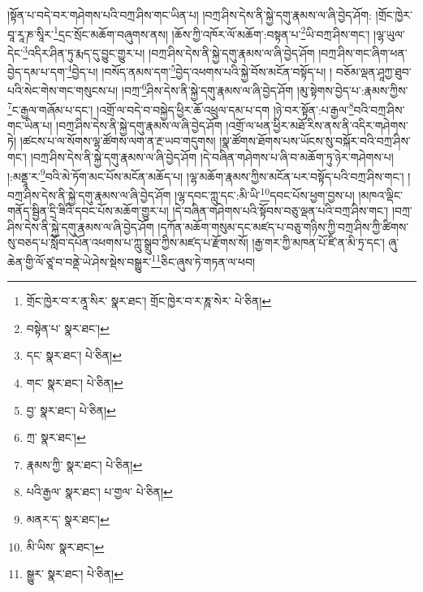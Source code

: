 །སྟོན་པ་བདེ་བར་གཤེགས་པའི་བཀྲ་ཤིས་གང་ཡིན་པ། །བཀྲ་ཤིས་དེས་ནི་སྐྱེ་དགུ་རྣམས་ལ་ཞི་བྱེད་ཤོག: །གྲོང་ཁྱེར་བཱ་རཱ་ཎ་སཱིར་\footnote{གྲོང་ཁྱེར་བ་ར་ནཱ་སིར་  སྣར་ཐང་། གྲོང་ཁྱེར་བ་ར་ཎཱ་སེར་  པེ་ཅིན། }དྲང་སྲོང་མཆོག་བཞུགས་ནས། །ཆོས་ཀྱི་འཁོར་ལོ་མཆོག་:བསྟན་པ་\footnote{བསྟེན་པ་  སྣར་ཐང་། }ཡི་བཀྲ་ཤིས་གང་། །ལྷ་ཡུལ་དེང་\footnote{དང་  སྣར་ཐང་།  པེ་ཅིན། }འདིར་ཤིན་ཏུ་རྨད་དུ་བྱུང་གྱུར་པ། །བཀྲ་ཤིས་དེས་ནི་སྐྱེ་དགུ་རྣམས་ལ་ཞི་བྱེད་ཤོག །བཀྲ་ཤིས་གང་ཞིག་ཕན་བྱེད་དམ་པ་དག་\footnote{གང་  སྣར་ཐང་།  པེ་ཅིན། }བྱེད་པ། །བསོད་ནམས་དག་\footnote{བྱ་  སྣར་ཐང་།  པེ་ཅིན། }བྱེད་འཕགས་པའི་སྐྱེ་བོས་མངོན་བསྟོད་པ། །
བཅོམ་ལྡན་ཤཱཀྱ་ཐུབ་པའི་སེང་གེས་གང་གསུངས་པ། །བཀྲ་\footnote{ཀྲ་  སྣར་ཐང་། }ཤིས་དེས་ནི་སྐྱེ་དགུ་རྣམས་ལ་ཞི་བྱེད་ཤོག །མུ་སྟེགས་བྱེད་པ་:རྣམས་ཀྱིས་\footnote{རྣམས་ཀྱི་  སྣར་ཐང་།  པེ་ཅིན། }ང་རྒྱལ་གཞོམ་པ་དང་། །འགྲོ་ལ་བདེ་བ་བསྐྱེད་ཕྱིར་ཆོ་འཕྲུལ་དམ་པ་དག །ཉེ་བར་སྟོན་:པ་རྒྱལ་\footnote{པའི་རྒྱལ་  སྣར་ཐང་། པ་གྱལ་  པེ་ཅིན། }བའི་བཀྲ་ཤིས་གང་ཡིན་པ། །བཀྲ་ཤིས་དེས་ནི་སྐྱེ་དགུ་རྣམས་ལ་ཞི་བྱེད་ཤོག །འགྲོ་ལ་ཕན་ཕྱིར་མཐོ་རིས་ནས་ནི་འདིར་གཤེགས་ཏེ། །ཚངས་པ་ལ་སོགས་ལྷ་ཚོགས་ལག་ན་རྔ་ཡབ་གདུགས། །སྣ་ཚོགས་ཐོགས་པས་ཡོངས་སུ་བསྐོར་བའི་བཀྲ་ཤིས་གང་། །བཀྲ་ཤིས་དེས་ནི་སྐྱེ་དགུ་རྣམས་ལ་ཞི་བྱེད་ཤོག །དེ་བཞིན་གཤེགས་པ་ཞི་བ་མཆོག་ཏུ་ཉེར་གཤེགས་པ། །:མནྡཱ་ར་\footnote{མནར་ད་  སྣར་ཐང་། }བའི་མེ་ཏོག་མང་པོས་མངོན་མཆོད་པ། །ལྷ་མཆོག་རྣམས་ཀྱིས་མངོན་པར་བསྟོད་པའི་བཀྲ་ཤིས་གང་། །བཀྲ་ཤིས་དེས་ནི་སྐྱེ་དགུ་རྣམས་ལ་ཞི་བྱེད་ཤོག །ལྷ་དབང་ཀླུ་དང་:མི་ཡི་\footnote{མི་ཡིས་  སྣར་ཐང་། }དབང་པོས་ཕྱག་བྱས་པ། །མཁའ་ལྡིང་གནོད་སྦྱིན་དྲི་ཟིའི་དབང་པོས་མཆོག་གྱུར་པ། །དེ་བཞིན་གཤེགས་པའི་སྟོབས་བཅུ་ལྡན་པའི་བཀྲ་ཤིས་གང་། །བཀྲ་ཤིས་དེས་ནི་སྐྱེ་དགུ་རྣམས་ལ་ཞི་བྱེད་ཤོག །དཀོན་མཆོག་གསུམ་དང་མཛད་པ་བཅུ་གཉིས་ཀྱི་བཀྲ་ཤིས་ཀྱི་ཚིགས་སུ་བཅད་པ་སློབ་དཔོན་འཕགས་པ་ཀླུ་སྒྲུབ་ཀྱིས་མཛད་པ་རྫོགས་སོ། །རྒྱ་གར་ཀྱི་མཁན་པོ་ཛི་ན་མི་ཏྲ་དང་། ཞུ་ཆེན་གྱི་ལོ་ཙཱ་བ་བནྡེ་ཡེ་ཤེས་སྡེས་བསྒྱུར་\footnote{སྒྱུར་  སྣར་ཐང་།  པེ་ཅིན། }ཅིང་ཞུས་ཏེ་གཏན་ལ་ཕབ། 
